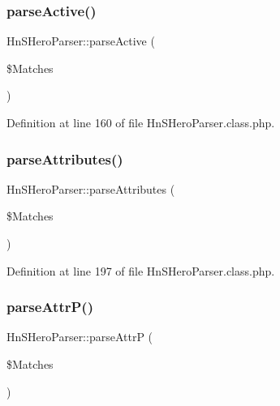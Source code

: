 \subsubsection{\texorpdfstring{parse\+Active()}{parseActive()}}
{\footnotesize\ttfamily Hn\+S\+Hero\+Parser\+::parse\+Active (\begin{DoxyParamCaption}\item[{}]{\$\+Matches }\end{DoxyParamCaption})\hspace{0.3cm}{\ttfamily [protected]}}



Definition at line 160 of file Hn\+S\+Hero\+Parser.\+class.\+php.

\mbox{\label{class_hn_s_hero_parser_a68bdb1bde555e9a9b70a37716838a681}} 
\subsubsection{\texorpdfstring{parse\+Attributes()}{parseAttributes()}}
{\footnotesize\ttfamily Hn\+S\+Hero\+Parser\+::parse\+Attributes (\begin{DoxyParamCaption}\item[{}]{\$\+Matches }\end{DoxyParamCaption})\hspace{0.3cm}{\ttfamily [protected]}}



Definition at line 197 of file Hn\+S\+Hero\+Parser.\+class.\+php.

\mbox{\label{class_hn_s_hero_parser_a9e86a51dd6f1b0d2f60a92a840e3deb4}} 
\subsubsection{\texorpdfstring{parse\+Attr\+P()}{parseAttrP()}}
{\footnotesize\ttfamily Hn\+S\+Hero\+Parser\+::parse\+AttrP (\begin{DoxyParamCaption}\item[{}]{\$\+Matches }\end{DoxyParamCaption})\hspace{0.3cm}{\ttfamily [protected]}}



